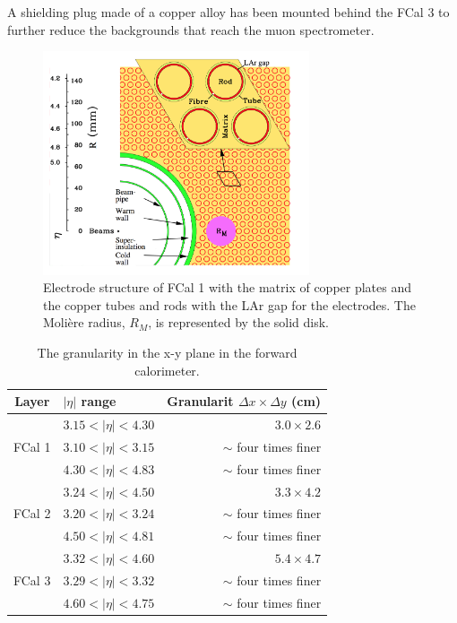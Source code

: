 A shielding plug made of a copper alloy has been mounted behind the FCal 3 to further reduce the backgrounds that reach the muon spectrometer.

\begin{figure}
\centering
\includegraphics[width=0.7\textwidth]{data/photo/detector/forward.png}
\caption{Electrode structure of FCal 1 with the matrix of copper plates and the copper tubes and rods with the LAr gap for the electrodes. The Moli\`ere radius, $R_M$, is represented by the solid disk. \cite{ATLAS_doc}}
\label{fig:forward_calorimeter}
\end{figure}

\begin{table}[htpb]
\centering
\begin{tabular}{|c|l|r|}
\hline
Layer & $|\eta|$ range & Granularit $\Delta x \times \Delta y$ (cm) \\
\hline
\hline
       & $3.15 < |\eta| < 4.30$   & $3.0 \times 2.6$ \\
FCal 1 & $3.10 < |\eta| < 3.15$   & $\sim$ four times finer \\
       & $4.30 < |\eta| < 4.83$   & $\sim$ four times finer \\
\hline
       & $3.24 < |\eta| < 4.50$   & $3.3 \times 4.2$ \\
FCal 2 & $3.20 < |\eta| < 3.24$   & $\sim$ four times finer \\
       & $4.50 < |\eta| < 4.81$   & $\sim$ four times finer \\
\hline
       & $3.32 < |\eta| < 4.60$   & $5.4 \times 4.7$ \\
FCal 3 & $3.29 < |\eta| < 3.32$   & $\sim$ four times finer \\
       & $4.60 < |\eta| < 4.75$   & $\sim$ four times finer \\
\hline
\end{tabular}
\caption{The granularity in the x-y plane in the forward calorimeter. \cite{ATLAS_doc}}
\label{tab:granularity_FCal}
\end{table}

